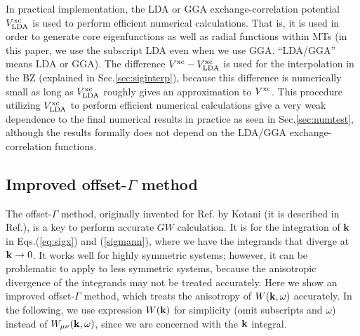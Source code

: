 \documentclass[a4paper,10pt,epsf,fleqn]{article}
\def\vxc{V^{\rm xc}}
\newcommand{\bfq}{{\bf q}}
\newcommand{\bfk}{{\bf k}}
\newcommand{\req}[1]{\mbox{Eq.~(\ref{#1})}}
\begin{document}
In practical implementation, the LDA or GGA exchange-correlation
potential $V^{\rm xc}_{\rm LDA}$ is used to perform efficient numerical calculations.
That is, it is used in order to generate core eigenfunctions as well as radial functions within MTs
(in this paper, we use the subscript LDA even when we use GGA. ``LDA/GGA'' means LDA or GGA).
The difference $\vxc-V^{\rm xc}_{\rm LDA}$ is used 
for the interpolation in the BZ (explained in Sec.\ref{sec:siginterp}),
because this difference is numerically small as long as 
$V^{\rm xc}_{\rm LDA}$ roughly gives an approximation to $\vxc$.
This procedure utilizing $V^{\rm xc}_{\rm LDA}$ to perform efficient numerical calculations
give a very weak dependence to the final numerical results in practice as seen in Sec.\ref{sec:numtest},
although the results formally does not depend on the LDA/GGA exchange-correlation functions.

\subsection{Improved offset-$\Gamma$ method}
\label{sec:kint}
The offset-$\Gamma$ method, originally 
invented for Ref.\cite{kotani_all-electron_2002} by Kotani 
(it is described in Ref.\cite{kotani_quasiparticle_2007}), 
is a key to perform accurate $GW$ calculation.
It is for the integration of $\bfk$ 
in Eqs.(\ref{eq:sigx}) and (\ref{sigmann}), where
we have the integrands that diverge at $\bfk \to 0$.
It works well for highly symmetric systems; however,
it can be problematic to apply to less symmetric systems, 
because the anisotropic divergence of the integrands 
may not be treated accurately.
Here we show an improved offset-$\Gamma$ method, which treats
the anisotropy of $W(\bfk,\omega)$ accurately.
In the following, we use expression $W(\bfk)$
for simplicity (omit subscripts and $\omega$)
instead of $W_{\mu \nu}(\bfk,\omega)$, 
since we are concerned with the $\bfk$ integral.

\end{document}
